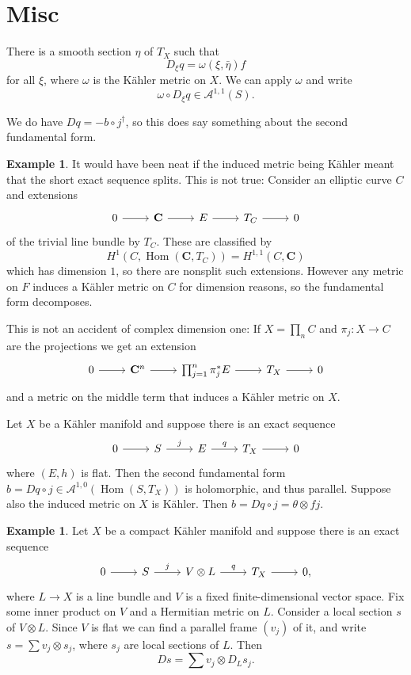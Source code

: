 \documentclass[12pt]{amsart}
\theoremstyle{definition}
\newtheorem{exam}[theo]{Example}
\newcommand{\cc}[1]{\mathcal{#1}}
\def\CC{\mathbf{C}}
\DeclareMathOperator{\Hom}{Hom}
\begin{document}
\section{Misc}


There is a smooth section $\eta$ of $T_X$ such that
\[
D_\xi q = \omega(\xi, \bar\eta) f
\]
for all $\xi$, where $\omega$ is the K\"ahler metric on $X$.
We can apply $\omega$ and write
\[
\omega \circ D_\xi q \in \cc A^{1,1}(S).
\]

We do have $Dq = - b \circ j^\dagger$, so this does say something about the second fundamental form.


\begin{exam}
It would have been neat if the induced metric being K\"ahler meant that the short exact sequence splits.
This is not true:
Consider an elliptic curve $C$ and extensions
\[
\begin{tikzcd}
0 \ar[r] &
\CC \ar[r] &
E \ar[r] &
T_C \ar[r] &
0
\end{tikzcd}
\]
of the trivial line bundle by $T_C$.
These are classified by 
\[
H^1(C, \Hom(\CC, T_C)) = H^{1,1}(C,\CC)
\]
which has dimension $1$, so there are nonsplit such extensions.
However any metric on $F$ induces a K\"ahler metric on $C$ for dimension reasons, so the fundamental form decomposes.

This is not an accident of complex dimension one:
If $X = \prod_n C$ and $\pi_j : X \to C$ are the projections we get an extension
\[
\begin{tikzcd}
0 \ar[r] &
\CC^n \ar[r] &
\prod_{j=1}^n \pi_j^*E \ar[r] &
T_X \ar[r] &
0
\end{tikzcd}
\]
and a metric on the middle term that induces a K\"ahler metric on $X$.
\end{exam}


Let $X$ be a K\"ahler manifold and suppose there is an exact sequence
\[
\begin{tikzcd}
0 \ar[r] &
S \ar[r,"j"] &
E \ar[r,"q"] &
T_X \ar[r] &
0
\end{tikzcd}
\]
where $(E,h)$ is flat.
Then the second fundamental form $b = Dq \circ j \in \cc A^{1,0}(\Hom(S,T_X))$ is holomorphic, and thus parallel.
Suppose also the induced metric on $X$ is K\"ahler.
Then $b = Dq \circ j = \theta \otimes fj$.




\begin{exam}
Let $X$ be a compact K\"ahler manifold and suppose there is an exact sequence
\[
\begin{tikzcd}
0 \ar[r] &
S \ar[r,"j"] &
V \otimes L \ar[r,"q"] &
T_X \ar[r] &
0,
\end{tikzcd}
\]
where $L \to X$ is a line bundle and $V$ is a fixed finite-dimensional vector space.
Fix some inner product on $V$ and a Hermitian metric on $L$.
Consider a local section $s$ of $V \otimes L$.
Since $V$ is flat we can find a parallel frame $(v_j)$ of it, and write $s = \sum v_j \otimes s_j$, where $s_j$ are local sections of $L$.
Then
\[
Ds = \sum v_j \otimes D_L s_j.
\]
\end{exam}
\end{document}
